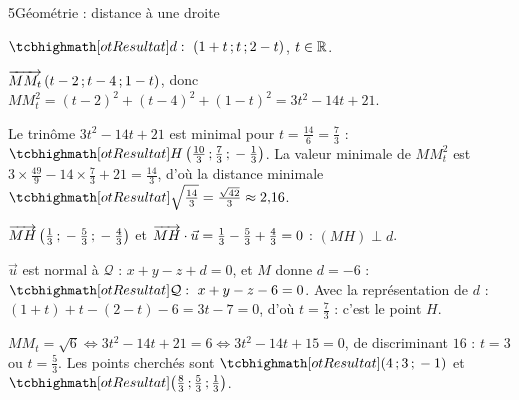\begin{corrigeBac}{5}{Géométrie : distance à une droite}
\begin{questions}
  \item $\res{d:\ (1+t\pv t\pv2-t)}$, $t\in\mathbb{R}$. 
  \item $\overrightarrow{MM_t}\,(t-2\,{;}\, t-4\,{;}\,1-t)$, donc $MM_t^{2}=(t-2)^{2}+(t-4)^{2}+(1-t)^{2}=3t^{2}-14t+21$. \pts{1 pt}
  \item Le trinôme $3t^{2}-14t+21$ est minimal pour $t=\frac{14}{6}=\frac73$ : $\res{H\left(\tfrac{10}{3}\pv\tfrac73\pv-\tfrac13\right)}$. La valeur
    minimale de $MM_t^{2}$ est $3\times\frac{49}9-14\times\frac73+21=\frac{14}{3}$, d'où la distance minimale $\res{\sqrt{\tfrac{14}{3}}=\tfrac{\sqrt{42}}{3}}\approx2{,}16$. 
  \item $\overrightarrow{MH}\left(\frac13\,{;}\,-\frac53\,{;}\,-\frac43\right)$ et $\overrightarrow{MH}\cdot\vec u=\frac13-\frac53+\frac43=0$ : $(MH)\perp d$. 
  \item $\vec u$ est normal à $\mathcal{Q}$ : $x+y-z+d=0$, et $M$ donne $d=-6$ : $\res{\mathcal{Q}:\ x+y-z-6=0}$. Avec la représentation
    de $d$ : $(1+t)+t-(2-t)-6=3t-7=0$, d'où $t=\frac73$ : c'est le point $H$. \pts{1 pt}
  \item $MM_t=\sqrt6\iff3t^{2}-14t+21=6\iff3t^{2}-14t+15=0$, de discriminant $16$ : $t=3$ ou $t=\frac53$. Les points cherchés sont
    $\res{(4\pv3\pv-1)}$ et $\res{\left(\tfrac83\pv\tfrac53\pv\tfrac13\right)}$. 
\end{questions}
\end{corrigeBac}
